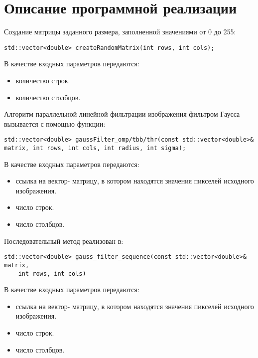 \documentclass{report}
\begin{document}
\section*{Описание программной реализации}
Создание матрицы заданного размера, заполненной значениями от 0 до 255:
\begin{lstlisting}
std::vector<double> createRandomMatrix(int rows, int cols);
\end{lstlisting}
\par В качестве входных параметров передаются:
\begin{itemize}
\item количество строк.
\item количество столбцов.
\end{itemize}
\par Алгоритм параллельной линейной фильтрации изображения фильтром Гаусса вызывается с помощью функции:
\begin{lstlisting}
std::vector<double> gaussFilter_omp/tbb/thr(const std::vector<double>& matrix, int rows, int cols, int radius, int sigma);
\end{lstlisting}
\par В качестве входных параметров передаются:
\begin{itemize}
\item ссылка на вектор- матрицу, в котором находятся значения пикселей исходного изображения.
\item число строк.
\item число столбцов.
\end{itemize}
\par Последовательный метод реализован в:
\begin{lstlisting}
std::vector<double> gauss_filter_sequence(const std::vector<double>& matrix,
    int rows, int cols)
\end{lstlisting}
\par В качестве входных параметров передаются:
\begin{itemize}
\item ссылка на вектор- матрицу, в котором находятся значения пикселей исходного изображения.
\item число строк.
\item число столбцов.
\end{itemize}
\newpage

\end{document}
